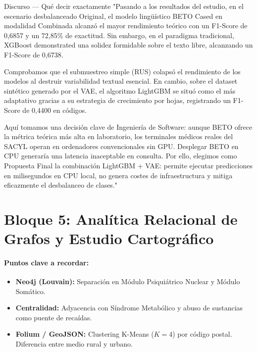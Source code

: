 \documentclass[11pt, a4paper]{article}
\newcommand{\timebadge}[2]{%
  \tcbox[
    on line,
    colback=timeBadge,
    colframe=speechBorder,
    arc=2mm,
    boxrule=0.5pt,
    top=1mm, bottom=1mm, left=2mm, right=2mm
  ]{\small \faClock\ \textbf{#1} \quad \textcolor{gray}{(#2)}}%
}
\begin{document}
\begin{speechbox}{Discurso — Qué decir exactamente}
"Pasando a los resultados del estudio, en el escenario desbalanceado Original, el modelo lingüístico BETO Cased en modalidad Combinada alcanzó el mayor rendimiento teórico con un F1-Score de 0,6857 y un 72,85\% de exactitud. Sin embargo, en el paradigma tradicional, XGBoost demonstrated una solidez formidable sobre el texto libre, alcanzando un F1-Score de 0,6738.

Comprobamos que el submuestreo simple (RUS) colapsó el rendimiento de los modelos al destruir variabilidad textual esencial. En cambio, sobre el dataset sintético generado por el VAE, el algoritmo LightGBM se situó como el más adaptativo gracias a su estrategia de crecimiento por hojas, registrando un F1-Score de 0,4400 en códigos.

Aquí tomamos una decisión clave de Ingeniería de Software: aunque BETO ofrece la métrica teórica más alta en laboratorio, los terminales médicos reales del SACYL operan en ordenadores convencionales sin GPU. Desplegar BETO en CPU generaría una latencia inaceptable en consulta. Por ello, elegimos como Propuesta Final la combinación LightGBM + VAE: permite ejecutar predicciones en milisegundos en CPU local, no genera costes de infraestructura y mitiga eficazmente el desbalanceo de clases."
\end{speechbox}

\clearpage
\section{Bloque 5: Analítica Relacional de Grafos y Estudio Cartográfico}
\timebadge{1 min 30 s}{Minuto 7:00 - 8:30}

\paragraph{Puntos clave a recordar:}
\begin{itemize}[noitemsep]
    \item \textbf{Neo4j (Louvain):} Separación en Módulo Psiquiátrico Nuclear y Módulo Somático.
    \item \textbf{Centralidad:} Adyacencia con Síndrome Metabólico y abuso de sustancias como puente de recaídas.
    \item \textbf{Folium / GeoJSON:} Clustering K-Means ($K=4$) por código postal. Diferencia entre medio rural y urbano.
\end{itemize}
\end{document}
